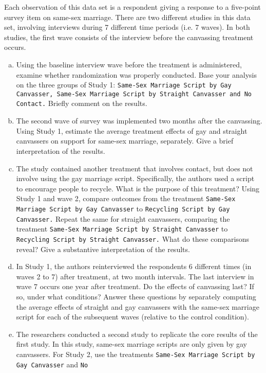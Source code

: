 \documentclass[11pt]{article}
\begin{document}
Each observation of this data set is a respondent giving a response to
a five-point survey item on same-sex marriage.  There are two
different studies in this data set, involving interviews during 7
different time periods (i.e. 7 waves).  In both studies, the first
wave consists of the interview before the canvassing treatment occurs.

\begin{enumerate}[a.]
	\item Using the baseline interview wave before the treatment is
  administered, examine whether randomization was properly conducted.
  Base your analysis on the three groups of Study 1: {\tt Same-Sex
  Marriage Script by Gay Canvasser, Same-Sex Marriage Script by
  Straight Canvasser and No Contact.}  Briefly comment on the
  results.
  \item The second wave of survey was implemented two months after the
  canvassing.  Using Study 1, estimate the average treatment effects
  of gay and straight canvassers on support for same-sex marriage,
  separately.  Give a brief interpretation of the results.
  \item The study contained another treatment that involves contact, but
  does not involve using the gay marriage script.  Specifically, the
  authors used a script to encourage people to recycle.  What is the
  purpose of this treatment?  Using Study 1 and wave 2, compare
  outcomes from the treatment {\tt Same-Sex Marriage Script by Gay
  Canvasser} to {\tt Recycling Script by Gay Canvasser.}  Repeat the
  same for straight canvassers, comparing the treatment {\tt Same-Sex
  Marriage Script by Straight Canvasser} to {\tt Recycling Script by
  Straight Canvasser.}  What do these comparisons reveal?  Give a
  substantive interpretation of the results.
  \item In Study 1, the authors reinterviewed the respondents 6
  different times (in waves 2 to 7) after treatment, at two month
  intervals.  The last interview in wave 7 occurs one year after
  treatment.  Do the effects of canvassing last?  If so, under what
  conditions?  Answer these questions by separately computing the
  average effects of straight and gay canvassers with the same-sex
  marriage script for each of the subsequent waves (relative to the
  control condition).
  \item The researchers conducted a second study to replicate the core
  results of the first study.  In this study, same-sex marriage
  scripts are only given by gay canvassers.  For Study 2, use the
  treatments {\tt Same-Sex Marriage Script by Gay Canvasser} and {\tt No
}
\end{enumerate}
\end{document}
